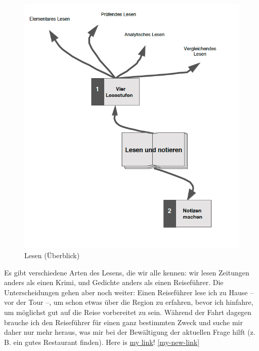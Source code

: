 \documentclass[]{book}
\theoremstyle{definition}
\theoremstyle{definition}
\theoremstyle{definition}
\theoremstyle{remark}
\begin{document}
\begin{figure}

{\centering \includegraphics{images/lesen-min} 

}

\caption{Lesen (Überblick)}\label{fig:unnamed-chunk-15}
\end{figure}

Es gibt verschiedene Arten des Lesens, die wir alle kennen: wir lesen
Zeitungen anders als einen Krimi, und Gedichte anders als einen
Reiseführer. Die Unterscheidungen gehen aber noch weiter: Einen
Reiseführer lese ich zu Hause -- vor der Tour --, um schon etwas über
die Region zu erfahren, bevor ich hinfahre, um möglichst gut auf die
Reise vorbereitet zu sein. Während der Fahrt dagegen brauche ich den
Reiseführer für einen ganz bestimmten Zweck und suche mir daher nur mehr
heraus, was mir bei der Bewältigung der aktuellen Frage hilft (z. B. ein
gutes Restaurant finden). Here is \protect\hyperlink{my-new-link}{my
link}! \ref{my-new-link}
\end{document}
